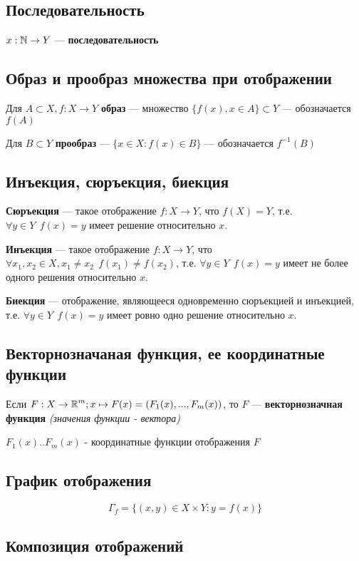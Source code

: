 \subsection{Последовательность}

$x:\operatorname*{\mathbb{N}} \rightarrow Y$ --- \textbf{последовательность}

\subsection{Образ и прообраз множества при отображении}

Для $A\subset X, f:X\to Y$ \textbf{образ} --- множество $\{f(x), x\in A\} \subset Y$ --- обозначается $f(A)$


Для $B\subset Y$ \textbf{прообраз} --- $\{ x\in X : f(x)\in B \}$ --- обозначается $f^{-1}(B)$

\subsection{Инъекция, сюръекция, биекция}

\textbf{Сюръекция} --- такое отображение $f: X\to Y$, что $f(X)=Y$, т.е. $\forall y\in Y \ \ f(x)=y$ имеет решение относительно $x$.


\textbf{Инъекция} --- такое отображение $f: X\to Y$, что $\forall x_1, x_2 \in X, x_1\not=x_2 \ \ f(x_1)\not=f(x_2)$, т.е. $\forall y\in Y \ \ f(x)=y$ имеет не более одного решения относительно $x$.


\textbf{Биекция} --- отображение, являющееся одновременно сюръекцией и инъекцией, т.е. $\forall y\in Y \ \ f(x)=y$ имеет ровно одно решение относительно $x$.

\subsection{Векторнозначаная функция, ее координатные функции}

Если $F:X\to \operatorname*{\mathbb{R}}^m; x\mapsto F(x) = (F_1(x), ..., F_m(x))$, то $F$ --- \textbf{векторнозначная функция} \textit{(значения функции - вектора)}


$F_1(x)..F_m(x)$ - координатные функции отображения $F$

\subsection{График отображения}

$$\Gamma_f = \{(x,y)\in X\times Y: y = f(x) \}$$

\subsection{Композиция отображений}

